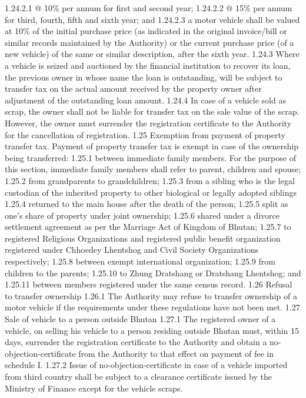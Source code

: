 \documentclass[
]{book}
\begin{document}
1.24.2.1 @ 10\% per annum for first and second year;
1.24.2.2 @ 15\% per annum for third, fourth, fifth and sixth year; and
1.24.2.3 a motor vehicle shall be valued at 10\% of the initial purchase price (as indicated in the original invoice/bill or similar records maintained by the Authority) or the current purchase price (of a new vehicle) of the same or similar description, after the sixth year.
1.24.3 Where a vehicle is seized and auctioned by the financial institution to recover its loan, the previous owner in whose name the loan is outstanding, will be subject to transfer tax on the actual amount received by the property owner after adjustment of the outstanding loan amount.
1.24.4 In case of a vehicle sold as scrap, the owner shall not be liable for transfer tax on the sale value of the scrap. However, the owner must surrender the registration certificate to the Authority for the cancellation of registration.
1.25 Exemption from payment of property transfer tax.
Payment of property transfer tax is exempt in case of the ownership being transferred:
1.25.1 between immediate family members. For the purpose of this section, immediate family members shall refer to parent, children and spouse;
1.25.2 from grandparents to grandchildren;
1.25.3 from a sibling who is the legal custodian of the inherited property to other biological or legally adopted siblings
1.25.4 returned to the main house after the death of the person;
1.25.5 split as one's share of property under joint ownership;
1.25.6 shared under a divorce settlement agreement as per the Marriage Act of Kingdom of Bhutan;
1.25.7 to registered Religious Organizations and registered public benefit organization registered under Chhoedey Lhentshog and Civil Society Organizations respectively;
1.25.8 between exempt international organization;
1.25.9 from children to the parents;
1.25.10 to Zhung Dratshang or Dratshang Lhentshog; and
1.25.11 between members registered under the same census record.
1.26 Refusal to transfer ownership
1.26.1 The Authority may refuse to transfer ownership of a motor vehicle if the requirements under these regulations have not been met.
1.27 Sale of vehicle to a person outside Bhutan
1.27.1 The registered owner of a vehicle, on selling his vehicle to a person residing outside Bhutan must, within 15 days, surrender the registration certificate to the Authority and obtain a no-objection-certificate from the Authority to that effect on payment of fee in schedule I.
1.27.2 Issue of no-objection-certificate in case of a vehicle imported from third country shall be subject to a clearance certificate issued by the Ministry of Finance except for the vehicle scraps.
\end{document}

